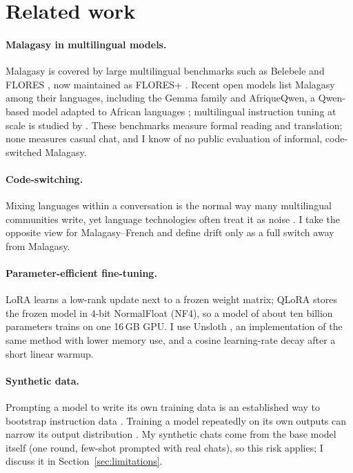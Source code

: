 \documentclass[11pt]{article}
\begin{document}
\section{Related work}
\label{sec:related}
\paragraph{Malagasy in multilingual models.} Malagasy is covered by large multilingual benchmarks such as
Belebele \citep{bandarkar-etal-2024-belebele} and FLORES \citep{goyal-etal-2022-flores,nllb2022}, now
maintained as FLORES+ \citep{burchell-etal-2024-findings,floresplus}. Recent open models list Malagasy
among their languages, including the Gemma family \citep{gemma3,gemma4} and AfriqueQwen, a Qwen-based
model adapted to African languages \citep{afriqueqwen}; multilingual instruction tuning at scale is
studied by \citet{ustun-etal-2024-aya}. These benchmarks measure formal reading and translation; none
measures casual chat, and I know of no public evaluation of informal, code-switched Malagasy.

\paragraph{Code-switching.} Mixing languages within a conversation is the normal way many multilingual
communities write, yet language technologies often treat it as noise \citep{dogruoz-etal-2021-survey}.
I take the opposite view for Malagasy--French and define drift only as a full switch away from Malagasy.

\paragraph{Parameter-efficient fine-tuning.} LoRA \citep{hu2022lora} learns a low-rank update next to a
frozen weight matrix; QLoRA \citep{dettmers2023qlora} stores the frozen model in 4-bit NormalFloat (NF4),
so a model of about ten billion parameters trains on one 16\,GB GPU. I use Unsloth \citep{unsloth}, an
implementation of the same method with lower memory use, and a cosine learning-rate decay
\citep{loshchilov2017sgdr} after a short linear warmup.

\paragraph{Synthetic data.} Prompting a model to write its own training data is an established way to
bootstrap instruction data \citep{wang-etal-2023-self}. Training a model repeatedly on its own outputs
can narrow its output distribution \citep{shumailov2024collapse}. My synthetic chats come from the base
model itself (one round, few-shot prompted with real chats), so this risk applies; I discuss it in
Section~\ref{sec:limitations}.
\end{document}
